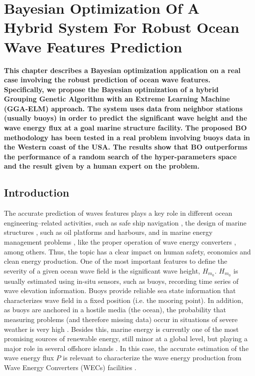 
\chapter{Bayesian Optimization Of A Hybrid System For Robust Ocean Wave Features Prediction} %
\label{Chapter7}

{\bf \small{
This chapter describes a Bayesian optimization application on a real case involving the robust prediction of ocean wave features. Specifically, we propose the Bayesian optimization of a hybrid Grouping Genetic Algorithm with an Extreme Learning Machine (GGA-ELM) approach. The system uses data from neighbor stations (usually buoys) in order to predict the significant wave height and the wave energy flux at a goal marine structure facility. The proposed BO methodology has been tested in a real problem involving buoys data in the Western coast of the USA. The results show that BO outperforms the performance of a random search of the hyper-parameters space and the result given by a human expert on the problem.
}}

\section{Introduction}
The accurate prediction of waves features plays a key role in different ocean engineering--related activities, such as safe ship navigation \citep{zheng2016path,liu2016path}, the design of marine structures \citep{comola2014damage,kim2014determining}, such as oil platforms and harbours, and in marine energy management problems \cite{arinaga2012atlas,esteban2012current}, like the proper operation of wave energy converters \citep{lopez2013review}, among others. Thus, the topic has a clear impact on human safety, economics and clean energy production. One of the most important features to define the severity of a given ocean wave field is the significant wave height, $H_{m_0}$. $H_{m_0}$ is usually estimated using in-situ sensors, such as buoys, recording time series of wave elevation information. Buoys provide reliable sea state information that characterizes wave field in a fixed position (i.e. the mooring point). In addition, as buoys are anchored in a hostile media (the ocean), the probability that measuring problems (and therefore missing data) occur in situations of severe weather is very high \citep{rao2005hindcasting}. Besides this, marine energy is currently one of the most promising sources of renewable energy, still minor at a global level, but playing a major role in several offshore islands \citep{bahaj2011generating,antonio2010wave,fadaeenejad2014new,rusu2012wave}. In this case, the accurate estimation of the wave energy flux $P$ is relevant to characterize the wave energy production from Wave Energy Converters (WECs) facilities \citep{cuadra2016computational}.

